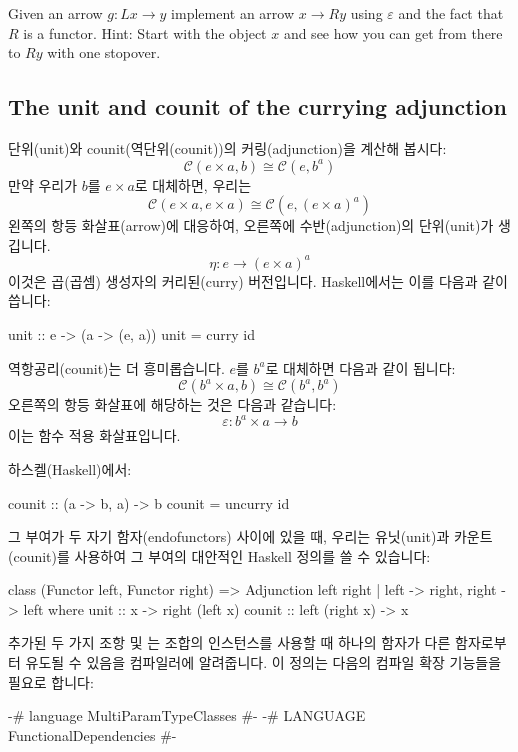 \documentclass[DaoFP]{subfiles}
\begin{document}
\begin{exercise}
Given an arrow $g \colon L x \to y$ implement an arrow $x \to R y$ using $\varepsilon$ and the fact that $R$ is a functor. Hint: Start with the object $x$ and see how you can get from there to $R y$ with one stopover.
\end{exercise}

\subsection{The unit and counit of the currying adjunction}

단위(unit)와 counit(역단위(counit))의 커링(adjunction)을 계산해 봅시다:
\[  \mathcal{C}(e \times a, b ) \cong  \mathcal{C} (e, b^a)  \]
만약 우리가 $b$를 $e \times a$로 대체하면, 우리는
\[  \mathcal{C}(e \times a, e \times a ) \cong  \mathcal{C} (e, (e \times a)^a)  \]
왼쪽의 항등 화살표(arrow)에 대응하여, 오른쪽에 수반(adjunction)의 단위(unit)가 생깁니다.
\[ \eta \colon e \to (e \times a)^a \]
이것은 곱(곱셈) 생성자의 커리된(curry) 버전입니다. Haskell에서는 이를 다음과 같이 씁니다:
\begin{haskell}
unit :: e -> (a -> (e, a))
unit = curry id
\end{haskell}

역항공리(counit)는 더 흥미롭습니다. $e$를 $b^a$로 대체하면 다음과 같이 됩니다:
\[  \mathcal{C}(b^a \times a, b ) \cong  \mathcal{C} (b^a, b^a)  \]
오른쪽의 항등 화살표에 해당하는 것은 다음과 같습니다:
\[ \varepsilon \colon b^a \times a \to b \]
이는 함수 적용 화살표입니다.

하스켈(Haskell)에서:
\begin{haskell}
counit :: (a -> b, a) -> b
counit = uncurry id
\end{haskell}

그 부여가 두 자기 함자(endofunctors) 사이에 있을 때, 우리는 유닛(unit)과 카운트(counit)를 사용하여 그 부여의 대안적인 Haskell 정의를 쓸 수 있습니다:
\begin{haskell}
class (Functor left, Functor right) => 
  Adjunction left right | left -> right, right -> left where
    unit   :: x -> right (left x)
    counit :: left (right x) -> x
\end{haskell}
추가된 두 가지 조항  및 는 조합의 인스턴스를 사용할 때 하나의 함자가 다른 함자로부터 유도될 수 있음을 컴파일러에 알려줍니다. 이 정의는 다음의 컴파일 확장 기능들을 필요로 합니다:
\begin{haskell}
{-# language MultiParamTypeClasses #-}
{-# LANGUAGE FunctionalDependencies #-}
\end{haskell}
\end{document}
